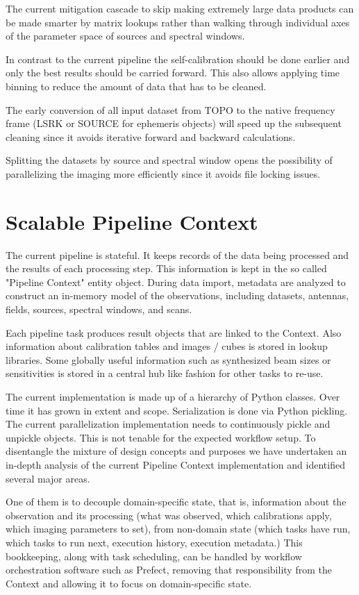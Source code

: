 \documentclass[11pt,twoside]{article}
\begin{document}
The current mitigation cascade to skip making extremely large data
products can be made smarter by matrix lookups rather than walking
through individual axes of the parameter space of sources and spectral
windows.

In contrast to the current pipeline the self-calibration should be done
earlier and only the best results should be carried forward. This also
allows applying time binning to reduce the amount of data that has to be
cleaned.

The early conversion of all input dataset from TOPO to the native
frequency frame (LSRK or SOURCE for ephemeris objects) will speed up
the subsequent cleaning since it avoids iterative forward and backward
calculations.

Splitting the datasets by source and spectral window opens the
possibility of parallelizing the imaging more efficiently since it
avoids file locking issues.

\section{Scalable Pipeline Context}
The current pipeline is stateful. It keeps records of the data being
processed and the results of each processing step. This information is
kept in the so called "Pipeline Context" entity object. During data
import, metadata are analyzed to construct an in-memory model of the
observations, including datasets, antennas, fields, sources, spectral
windows, and scans.

Each pipeline task produces result objects that are linked to the
Context. Also information about calibration tables and images / cubes is
stored in lookup libraries. Some globally useful information such as
synthesized beam sizes or sensitivities is stored in a central hub like
fashion for other tasks to re-use.

The current implementation is made up of a hierarchy of Python classes.
Over time it has grown in extent and scope. Serialization is done via
Python pickling. The current parallelization implementation needs to
continuously pickle and unpickle objects. This is not tenable for the
expected workflow setup. To disentangle the mixture of design concepts
and purposes we have undertaken an in-depth analysis of the current
Pipeline Context implementation and identified several major areas.

One of them is to decouple domain-specific state, that is, information
about the observation and its processing (what was observed, which
calibrations apply, which imaging parameters to set), from non-domain
state (which tasks have run, which tasks to run next, execution history,
execution metadata.) This bookkeeping, along with task scheduling, can be
handled by workflow orchestration software such as Prefect, removing that
responsibility from the Context and allowing it to focus on
domain-specific state.
\end{document}
